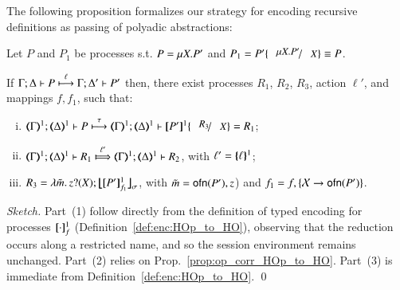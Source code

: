 
The following proposition formalizes our strategy  for encoding
recursive definitions as passing of polyadic abstractions:
%
\begin{proposition}\rm
	\label{prop:op_corr_HOprec_to_HO}
	Let $P$ and $P_1$ be \HOp processes s.t. 
	$P =\mu X. P'$ and
	$P_1 = P'\subst{\recp{X}{P'}}{\varp{X}} \scong P$.

	\noi If %
	$\Gamma; \Delta \vdash P \stackrel{\ell}{\longmapsto} \Gamma; \Delta' \vdash P' $
	then,  there exist
	processes $R_1$, $R_2$,  $R_3$, action $\ell'$,
	and mappings $f, f_1$, such that: 
	\begin{enumerate}[(i)]
	\item 
	$\stytra{\mapt{\Gamma}^{1}}{\tau}{\mapt{\Delta}^{1}}{P}{\mapt{\Delta}^{1}}{\map{P'}^{1}\subst{R_3}{X}} = R_1$;
	\item 
	$\wtytra{\mapt{\Gamma}^{1}}{\ell'}{\mapt{\Delta}^{1}}{R_1}{\mapt{\Delta}^{1}}{R_2} $,  with $\ell' = \{\!\!\{\ell\}\!\!\}^{1}$;
	
	\item $R_3 = \abs{\tilde{m}}\binp{z}{X}\auxmap{\map{P'}^{1}_{f_{1}}}{\sigma}$, with $\tilde{m} = \mathsf{ofn}(P'),z$)
	and
	$f_1 = f, \{\mathcal{X} \to \mathsf{ofn}(P')\}$.
	\end{enumerate}
\end{proposition}

\begin{proof}[Sketch]
	Part~(1) follow directly from the definition of typed encoding for processes $[\!\![\cdot]\!\!]^{1}_{f}$ (Definition~\ref{def:enc:HOp_to_HO}),
	observing that the reduction occurs along a restricted name, and so the session environment remains unchanged.
	Part~(2) relies on  Prop.~\ref{prop:op_corr_HOp_to_HO}.
	Part~(3) is immediate from Definition~\ref{def:enc:HOp_to_HO}.
	\qed
\end{proof}

